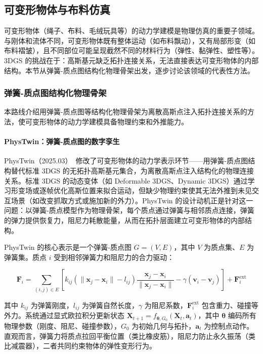 \subsection{可变形物体与布料仿真}

可变形物体（绳子、布料、毛绒玩具等）的动力学建模是物理仿真的重要子领域。与刚体和流体不同，可变形物体既有整体运动（如布料飘动），又有局部形变（如布料褶皱），且不同部位可能呈现截然不同的材料行为（弹性、黏弹性、塑性等）。3DGS 的挑战在于：高斯基元缺乏拓扑连接关系，无法直接表达可变形物体的内部结构。本节从弹簧-质点图结构化物理骨架出发，逐步讨论该领域的代表性方法。

\subsubsection{弹簧-质点图结构化物理骨架}

本路线介绍用弹簧-质点图等结构化物理骨架为离散高斯点注入拓扑连接关系的方法，使可变形物体的动力学建模具备物理约束和外推能力。

\paragraph{PhysTwin：弹簧-质点图的数字孪生}

PhysTwin（2025.03）~\cite{2503_17973}修改了可变形物体的动力学表示环节——用弹簧-质点图结构替代标准 3DGS 的无拓扑高斯基元集合，为离散高斯点注入结构化的物理连接关系。标准 3DGS 的动态变体（如 Deformable 3DGS、Dynamic 3DGS）通过学习形变场或逐帧优化高斯位置来拟合运动，但缺少物理约束使其无法外推到未见交互场景（如改变抓取方式或施加新的外力）。PhysTwin 的设计动机正是针对这一问题：以弹簧-质点模型作为物理骨架，每个质点通过弹簧与相邻质点连接，弹簧的弹力提供恢复力，阻尼力耗散能量，从而在拓扑层面建立可变形物体的内部结构。

PhysTwin 的核心表示是一个弹簧-质点图 $G=(V,E)$，其中 $V$ 为质点集、$E$ 为弹簧集。质点 $i$ 受到相邻弹簧力和阻尼力的合力驱动：

\begin{equation}
\mathbf{F}_i = \sum_{(i,j)\in E} \left[ k_{ij}(\|\mathbf{x}_j - \mathbf{x}_i\| - l_{ij})\frac{\mathbf{x}_j - \mathbf{x}_i}{\|\mathbf{x}_j - \mathbf{x}_i\|} - \gamma(\mathbf{v}_i - \mathbf{v}_j) \right] + \mathbf{F}_i^{\text{ext}}
\end{equation}

其中 $k_{ij}$ 为弹簧刚度，$l_{ij}$ 为弹簧自然长度，$\gamma$ 为阻尼系数，$\mathbf{F}_i^{\text{ext}}$ 包含重力、碰撞等外力。系统通过显式欧拉积分更新状态 $\mathbf{X}_{t+1} = f_{\boldsymbol{\theta}, G_0}(\mathbf{X}_t, \mathbf{a}_t)$，其中 $\boldsymbol{\theta}$ 编码所有物理参数（刚度、阻尼、碰撞参数），$G_0$ 为初始几何与拓扑，$\mathbf{a}_t$ 为控制点动作。直观而言，弹簧力将质点拉回平衡位置（类比橡皮筋），阻尼力防止永久振荡（类比减震器），二者共同约束物体的弹性变形行为。

